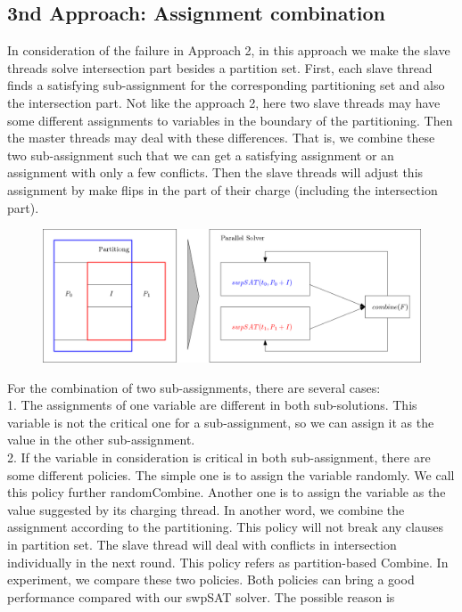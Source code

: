 \documentclass[12pt,a4paper,twoside]{scrartcl}
\numberwithin{equation}{section}
\begin{document}
\subsection{3nd Approach: Assignment combination}
In consideration of the failure in Approach 2, in this approach we make the slave threads solve intersection part besides a partition set. First, each slave thread finds a satisfying sub-assignment for the corresponding partitioning set and also the intersection part. Not like the approach 2, here two slave threads may have some different assignments to variables in the boundary of the partitioning. Then the master threads may deal with these differences. That is, we combine these two sub-assignment such that we can get a satisfying assignment or an assignment with only a few conflicts. Then the slave threads will adjust this assignment by make flips in the part of their charge (including the intersection part). 
\begin{figure}[H]
\begin{center}
  \includegraphics[scale = 0.3]{1/a3.png}
  \end{center}
  \label{a2}
  \end{figure}
For the combination of two sub-assignments, there are several cases:\\ 
1. The assignments of one variable are different in both sub-solutions. This variable is not the critical one for a sub-assignment, so we can assign it as the value in the other sub-assignment.\\
2. If the variable in consideration is critical in both sub-assignment, there are some different policies. The simple one is to assign the variable randomly. We call this policy further randomCombine. Another one is to assign the variable as the value suggested by its charging thread. In another word, we combine the assignment according to the partitioning. This policy will not break any clauses in partition set. The slave thread will deal with conflicts in intersection individually in the next round. This policy refers as partition-based Combine. In experiment, we compare these two policies. Both policies can bring a good performance compared with our swpSAT solver. The possible reason is  
\end{document}
